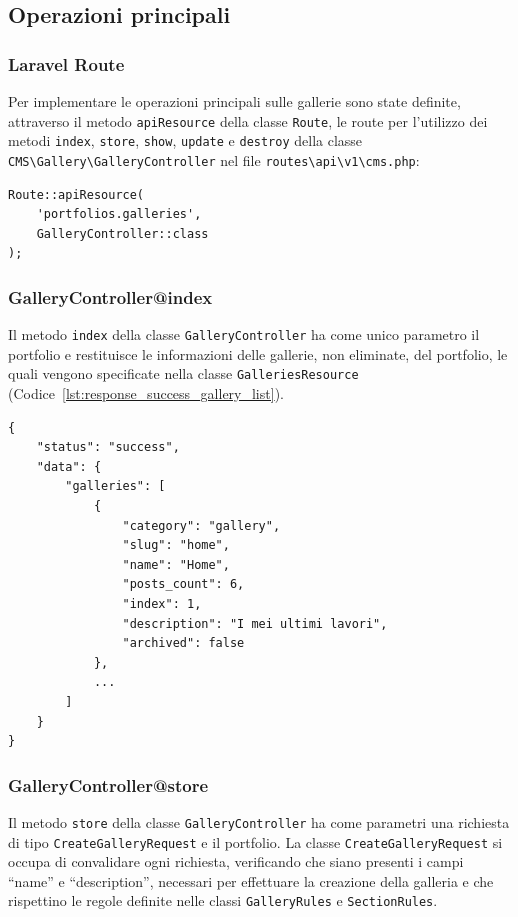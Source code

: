 \subsection{Operazioni principali}
\subsubsection{Laravel Route}
Per implementare le operazioni principali sulle gallerie sono state definite, attraverso il metodo \verb|apiResource| della classe \verb|Route|, le route per l'utilizzo dei metodi \verb|index|, \verb|store|, \verb|show|, \verb|update| e \verb|destroy| della classe \verb|CMS\Gallery\GalleryController| nel file \verb|routes\api\v1\cms.php|:
\begin{lstlisting}[caption={Route operazioni principali sulle gallerie}, label={lst:route_g_crud}]
Route::apiResource(
	'portfolios.galleries',
	GalleryController::class
);
\end{lstlisting}

\subsubsection{GalleryController@index}
Il metodo \verb|index| della classe \verb|GalleryController| ha come unico parametro il portfolio e restituisce le informazioni delle gallerie, non eliminate, del portfolio, le quali vengono specificate nella classe \verb|GalleriesResource| (Codice~\ref{lst:response_success_gallery_list}).
\begin{lstlisting}[caption={Risposta di successo lista delle gallerie}, label={lst:response_success_gallery_list}]
{
	"status": "success",
	"data": {
		"galleries": [
			{
				"category": "gallery",
				"slug": "home",
				"name": "Home",
				"posts_count": 6,
				"index": 1,
				"description": "I mei ultimi lavori",
				"archived": false
			},
			...
		]
	}
}
\end{lstlisting}


\subsubsection{GalleryController@store}
Il metodo \verb|store| della classe \verb|GalleryController| ha come parametri una richiesta di tipo \verb|CreateGalleryRequest| e il portfolio. La classe \verb|CreateGalleryRequest| si occupa di convalidare ogni richiesta, verificando che siano presenti i campi ``name'' e ``description'', necessari per effettuare la creazione della galleria e che rispettino le regole definite nelle classi \verb|GalleryRules| e \verb|SectionRules|. 


